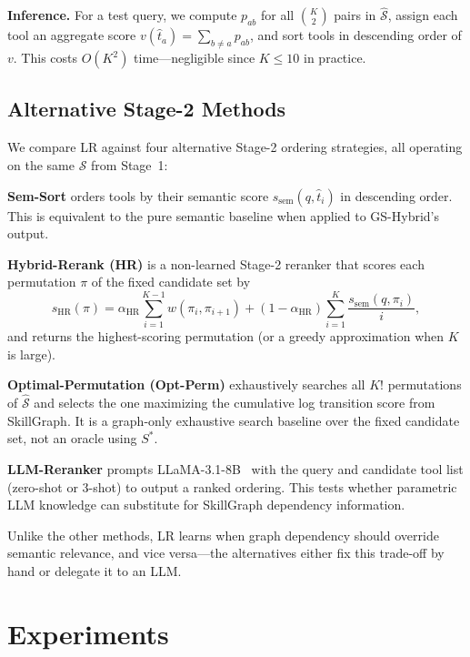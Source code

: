 \documentclass[lettersize,journal]{IEEEtran}
\begin{document}
\textbf{Inference.}
For a test query, we compute $p_{ab}$ for all $\binom{K}{2}$ pairs in $\hat{\mathcal{S}}$, assign each tool an aggregate score $v(\hat{t}_a) = \sum_{b \neq a} p_{ab}$, and sort tools in descending order of $v$.
This costs $O(K^2)$ time---negligible since $K \leq 10$ in practice.

\subsection{Alternative Stage-2 Methods}

We compare LR against four alternative Stage-2 ordering strategies, all operating on the same $\hat{\mathcal{S}}$ from Stage~1:

\textbf{Sem-Sort} orders tools by their semantic score $s_{\text{sem}}(q, \hat{t}_i)$ in descending order. This is equivalent to the pure semantic baseline when applied to GS-Hybrid's output.

\textbf{Hybrid-Rerank (HR)} is a non-learned Stage-2 reranker that scores each permutation $\pi$ of the fixed candidate set by
\begin{equation}
    s_{\text{HR}}(\pi)
    = \alpha_{\text{HR}} \sum_{i=1}^{K-1} w(\pi_i, \pi_{i+1})
    + (1 - \alpha_{\text{HR}}) \sum_{i=1}^{K} \frac{s_{\text{sem}}(q, \pi_i)}{i},
    \label{eq:hrscore}
\end{equation}
and returns the highest-scoring permutation (or a greedy approximation when $K$ is large).

\textbf{Optimal-Permutation (Opt-Perm)} exhaustively searches all $K!$ permutations of $\hat{\mathcal{S}}$ and selects the one maximizing the cumulative log transition score from SkillGraph. It is a graph-only exhaustive search baseline over the fixed candidate set, not an oracle using $S^*$.

\textbf{LLM-Reranker} prompts LLaMA-3.1-8B~\cite{llama3} with the query and candidate tool list (zero-shot or 3-shot) to output a ranked ordering. This tests whether parametric LLM knowledge can substitute for SkillGraph dependency information.

Unlike the other methods, LR learns when graph dependency should override semantic relevance, and vice versa---the alternatives either fix this trade-off by hand or delegate it to an LLM.


\section{Experiments}
\label{sec:experiments}
\end{document}
